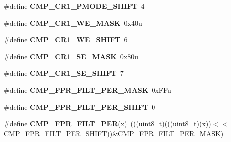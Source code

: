 \begin{DoxyCompactItemize}
\item 
\#define {\bfseries C\+M\+P\+\_\+\+C\+R1\+\_\+\+P\+M\+O\+D\+E\+\_\+\+S\+H\+I\+FT}~4\hypertarget{group__CMP__Register__Masks_ga35cfe45cce5ed6925e522e3c4527054a}{}\label{group__CMP__Register__Masks_ga35cfe45cce5ed6925e522e3c4527054a}

\item 
\#define {\bfseries C\+M\+P\+\_\+\+C\+R1\+\_\+\+W\+E\+\_\+\+M\+A\+SK}~0x40u\hypertarget{group__CMP__Register__Masks_ga70bc3069a7e105b59d01d83b4d1714b1}{}\label{group__CMP__Register__Masks_ga70bc3069a7e105b59d01d83b4d1714b1}

\item 
\#define {\bfseries C\+M\+P\+\_\+\+C\+R1\+\_\+\+W\+E\+\_\+\+S\+H\+I\+FT}~6\hypertarget{group__CMP__Register__Masks_ga386bf7ca4f7eb8faa4ba8346620667f2}{}\label{group__CMP__Register__Masks_ga386bf7ca4f7eb8faa4ba8346620667f2}

\item 
\#define {\bfseries C\+M\+P\+\_\+\+C\+R1\+\_\+\+S\+E\+\_\+\+M\+A\+SK}~0x80u\hypertarget{group__CMP__Register__Masks_ga899d139651dd67746e73452ff19e892b}{}\label{group__CMP__Register__Masks_ga899d139651dd67746e73452ff19e892b}

\item 
\#define {\bfseries C\+M\+P\+\_\+\+C\+R1\+\_\+\+S\+E\+\_\+\+S\+H\+I\+FT}~7\hypertarget{group__CMP__Register__Masks_ga57cd3f81d8844d4e0509f342ae5170bb}{}\label{group__CMP__Register__Masks_ga57cd3f81d8844d4e0509f342ae5170bb}

\item 
\#define {\bfseries C\+M\+P\+\_\+\+F\+P\+R\+\_\+\+F\+I\+L\+T\+\_\+\+P\+E\+R\+\_\+\+M\+A\+SK}~0x\+F\+Fu\hypertarget{group__CMP__Register__Masks_gaf8ca758656c156ecadfbb6f9e57a3eef}{}\label{group__CMP__Register__Masks_gaf8ca758656c156ecadfbb6f9e57a3eef}

\item 
\#define {\bfseries C\+M\+P\+\_\+\+F\+P\+R\+\_\+\+F\+I\+L\+T\+\_\+\+P\+E\+R\+\_\+\+S\+H\+I\+FT}~0\hypertarget{group__CMP__Register__Masks_gaa563be7a82c0c1e3802e7ac7c920bf3a}{}\label{group__CMP__Register__Masks_gaa563be7a82c0c1e3802e7ac7c920bf3a}

\item 
\#define {\bfseries C\+M\+P\+\_\+\+F\+P\+R\+\_\+\+F\+I\+L\+T\+\_\+\+P\+ER}(x)~(((uint8\+\_\+t)(((uint8\+\_\+t)(x))$<$$<$C\+M\+P\+\_\+\+F\+P\+R\+\_\+\+F\+I\+L\+T\+\_\+\+P\+E\+R\+\_\+\+S\+H\+I\+FT))\&C\+M\+P\+\_\+\+F\+P\+R\+\_\+\+F\+I\+L\+T\+\_\+\+P\+E\+R\+\_\+\+M\+A\+SK)\hypertarget{group__CMP__Register__Masks_ga006ee9cac0b4b9daa94e3b1d6a440627}{}\label{group__CMP__Register__Masks_ga006ee9cac0b4b9daa94e3b1d6a440627}


\end{DoxyCompactItemize}
